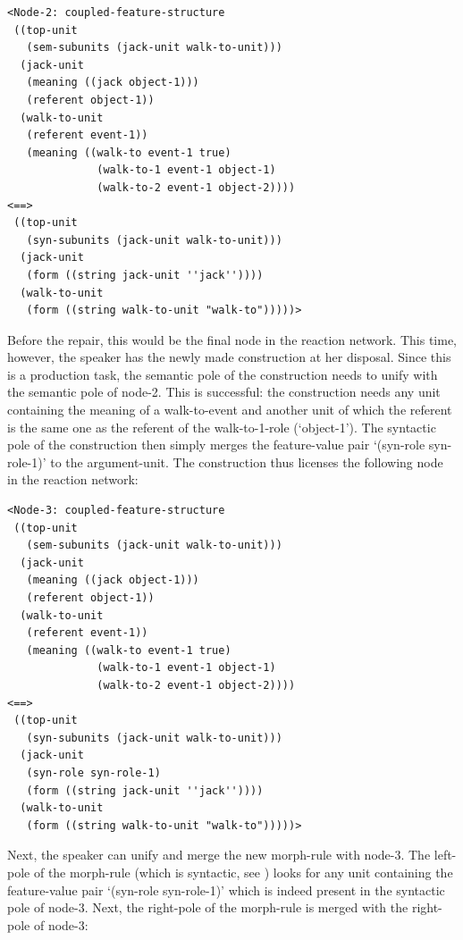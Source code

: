 \ea
\begin{lstlisting}
<Node-2: coupled-feature-structure
 ((top-unit
   (sem-subunits (jack-unit walk-to-unit)))
  (jack-unit
   (meaning ((jack object-1)))
   (referent object-1))
  (walk-to-unit
   (referent event-1))
   (meaning ((walk-to event-1 true)
              (walk-to-1 event-1 object-1)
              (walk-to-2 event-1 object-2))))
<==>
 ((top-unit
   (syn-subunits (jack-unit walk-to-unit)))
  (jack-unit
   (form ((string jack-unit ''jack''))))
  (walk-to-unit
   (form ((string walk-to-unit "walk-to")))))>
\end{lstlisting}
\z


Before the repair, this would be the final node in the reaction network. This time, however, the speaker has the newly made construction at her disposal. Since this is a production task, the semantic pole of the construction needs to unify with the semantic pole of node-2. This is successful: the construction needs any unit containing the meaning of a walk-to-event and another unit of which the referent is the same one as the referent of the walk-to-1-role (`object-1'). The syntactic pole of the construction then simply merges the feature-value pair `(syn-role syn-role-1)' to the argument-unit. The construction thus licenses the following node in the reaction network:


\ea
\begin{lstlisting}
<Node-3: coupled-feature-structure
 ((top-unit
   (sem-subunits (jack-unit walk-to-unit)))
  (jack-unit
   (meaning ((jack object-1)))
   (referent object-1))
  (walk-to-unit
   (referent event-1))
   (meaning ((walk-to event-1 true)
              (walk-to-1 event-1 object-1)
              (walk-to-2 event-1 object-2))))
<==>
 ((top-unit
   (syn-subunits (jack-unit walk-to-unit)))
  (jack-unit
   (syn-role syn-role-1)
   (form ((string jack-unit ''jack''))))
  (walk-to-unit
   (form ((string walk-to-unit "walk-to")))))>
\end{lstlisting}
\z


Next, the speaker can unify and merge the new morph-rule with node-3. The left-pole of the morph-rule (which is syntactic, see ) looks for any unit containing the feature-value pair `(syn-role syn-role-1)' which is indeed present in the syntactic pole of node-3. Next, the right-pole of the morph-rule is merged with the right-pole of node-3:


